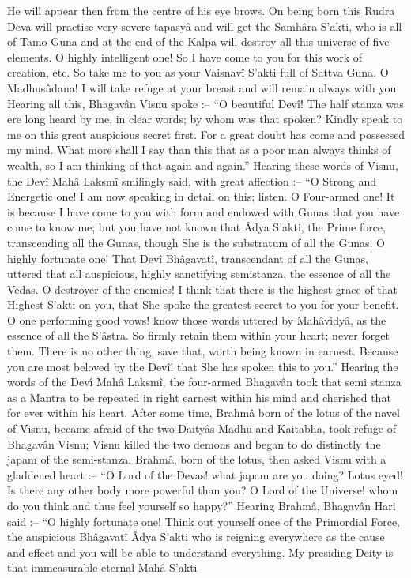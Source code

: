 He will appear then from the centre of his eye brows. On being born this Rudra Deva will practise very severe tapasyâ and will get the Samhâra S’akti, who is all of Tamo Guna and at the end of the Kalpa will destroy all this universe of five elements. O highly intelligent one! So I have come to you for this work of creation, etc. So take me to you as your Vaisnavî S’akti full of Sattva Guna. O Madhusûdana! I will take refuge at your breast and will remain always with you. Hearing all this, Bhagavân Visnu spoke :-- “O beautiful Devî! The half stanza was ere long heard by me, in clear words; by whom was that spoken? Kindly speak to me on this great auspicious secret first. For a great doubt has come and possessed my mind. What more shall I say than this that as a poor man always thinks of wealth, so I am thinking of that again and again.” Hearing these words of Visnu, the Devî Mahâ Laksmî smilingly said, with great affection :-- “O Strong and Energetic one! I am now speaking in detail on this; listen. O Four-armed one! It is because I have come to you with form and endowed with Gunas that you have come to know me; but you have not known that Âdya S’akti, the Prime force, transcending all the Gunas, though She is the substratum of all the Gunas. O highly fortunate one! That Devî Bhâgavatî, transcendant of all the Gunas, uttered that all auspicious, highly sanctifying semistanza, the essence of all the Vedas. O destroyer of the enemies! I think that there is the highest grace of that Highest S’akti on you, that She spoke the greatest secret to you for your benefit. O one performing good vows! know those words uttered by Mahâvidyâ, as the essence of all the S’âstra. So firmly retain them within your heart; never forget them. There is no other thing, save that, worth being known in earnest. Because you are most beloved by the Devî! that She has spoken this to you.” Hearing the words of the Devî Mahâ Laksmî, the four-armed Bhagavân took that semi stanza as a Mantra to be repeated in right earnest within his mind and cherished that for ever within his heart. After some time, Brahmâ born of the lotus of the navel of Visnu, became afraid of the two Daityâs Madhu and Kaitabha, took refuge of Bhagavân Visnu; Visnu killed the two demons and began to do distinctly the japam of the semi-stanza. Brahmâ, born of the lotus, then asked Visnu with a gladdened heart :-- “O Lord of the Devas! what japam are you doing? Lotus eyed! Is there any other body more powerful than you? O Lord of the Universe! whom do you think and thus feel yourself so happy?” Hearing Brahmâ, Bhagavân Hari said :-- “O highly fortunate one! Think out yourself once of the Primordial Force, the auspicious Bhâgavatî Âdya S’akti who is reigning everywhere as the cause and effect and you will be able to understand everything. My presiding Deity is that immeasurable eternal Mahâ S’akti

